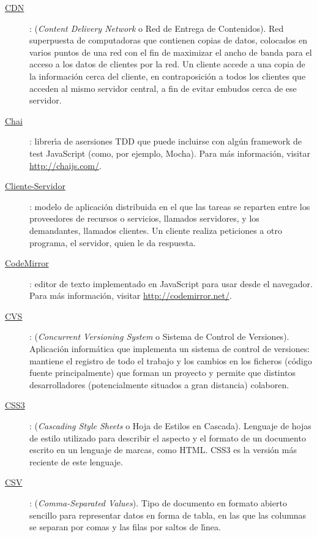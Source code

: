 \begin{description}
  \item[\underline{CDN}\label{apend1:cdn}]: (\textit{Content Delivery Network} o Red de Entrega de Contenidos). Red superpuesta de computadoras que contienen copias de datos, colocados en 
  varios puntos de una red con el fin de maximizar el ancho de banda para el acceso a los datos de clientes por la red. Un cliente accede a una copia de la informaci\'on cerca 
  del cliente, en contraposici\'on a todos los clientes que acceden al mismo servidor central, a fin de evitar embudos cerca de ese servidor.
  \bigskip

  \item[\underline{Chai}\label{apend1:chai}]: librer\'{\i}a de asersiones TDD que puede incluirse con alg\'un framework de test JavaScript (como, por ejemplo, Mocha). Para m\'as informaci\'on, 
  visitar {\small \url{http://chaijs.com/}}.
  \bigskip

  \item[\underline{Cliente-Servidor}\label{apend1:cs}]: modelo de aplicaci\'on distribuida en el que las tareas se reparten entre los proveedores de recursos o servicios, llamados servidores, 
  y los demandantes, llamados clientes. Un cliente realiza peticiones a otro programa, el servidor, quien le da respuesta.
  \bigskip

  \item[\underline{CodeMirror}\label{apend1:codemirror}]: editor de texto implementado en JavaScript para usar desde el navegador. Para m\'as informaci\'on, visitar 
  {\small \url{http://codemirror.net/}}.
  \bigskip

  \item[\underline{CVS}\label{apend1:cvs}]: (\textit{Concurrent Versioning System} o Sistema de Control de Versiones). Aplicaci\'on inform\'atica que implementa un sistema de control de 
  versiones: mantiene el registro de todo el trabajo y los cambios en los ficheros (c\'odigo fuente principalmente) que forman un proyecto y permite que distintos desarrolladores 
  (potencialmente situados a gran distancia) colaboren.
  \bigskip

  \item[\underline{CSS3}\label{apend1:css}]: (\textit{Cascading Style Sheets} o Hoja de Estilos en Cascada). Lenguaje de hojas de estilo utilizado para describir el aspecto y el formato de un 
  documento escrito en un lenguaje de marcas, como HTML. CSS3 es la versi\'on m\'as reciente de este lenguaje.
  \bigskip

  \item[\underline{CSV}\label{apend1:csv}]: (\textit{Comma-Separated Values}). Tipo de documento en formato abierto sencillo para representar datos en forma de tabla, en las que las columnas se 
  separan por comas y las filas por saltos de l\'{\i}nea. 
  \bigskip
\end{description}

